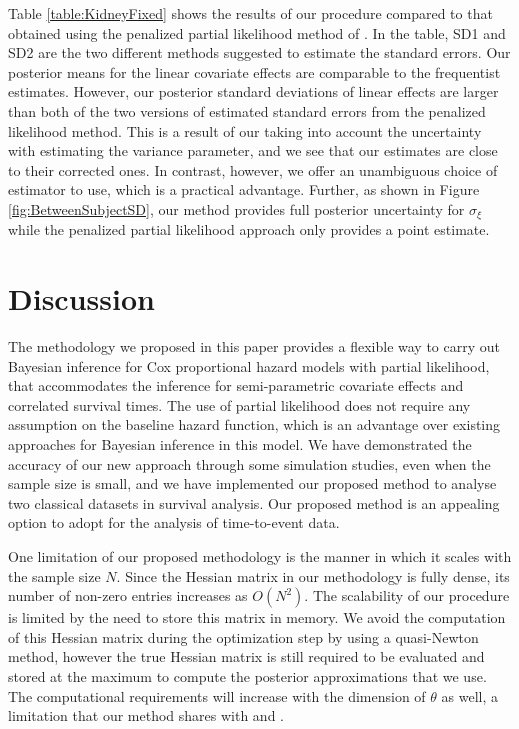 \documentclass[ba]{imsart}
\begin{document}
Table \ref{table:KidneyFixed} shows the results of our procedure compared to that obtained using the penalized partial likelihood method of \cite{freqPL}. In the table, SD1 and SD2 are the two different methods \cite{freqPL} suggested to estimate the standard errors. Our posterior means for the linear covariate effects are comparable to the frequentist estimates. However, our posterior standard deviations of linear effects are larger than both of the two versions of estimated standard errors from the penalized likelihood method. This is a result of our taking into account the uncertainty with estimating the variance parameter, and we see that our estimates are close to their corrected ones. In contrast, however, we offer an unambiguous choice of estimator to use, which is a practical advantage. Further, as shown in Figure \ref{fig:BetweenSubjectSD}, our method provides full posterior uncertainty for $\sigma_{\xi}$ while the penalized partial likelihood approach only provides a point estimate.

\section{Discussion}\label{sec:discussion}

The methodology we proposed in this paper provides a flexible way to carry out Bayesian inference for Cox proportional hazard models with partial likelihood, that accommodates the inference for semi-parametric covariate effects and correlated survival times. The use of partial likelihood does not require any assumption on the baseline hazard function, which is an advantage over existing approaches for Bayesian inference in this model. We have demonstrated the accuracy of our new approach through some simulation studies, even when the sample size is small, and we have implemented our proposed method to analyse two classical datasets in survival analysis. Our proposed method is an appealing option to adopt for the analysis of time-to-event data.

One limitation of our proposed methodology is the manner in which it scales with the sample size $N$. Since the Hessian matrix in our methodology is fully dense, its number of non-zero entries increases as $O(N^{2})$. The scalability of our procedure is limited by the need to store this matrix in memory. We avoid the computation of this Hessian matrix during the optimization step by using a quasi-Newton method, however the true Hessian matrix is still required to be evaluated and stored at the maximum to compute the posterior approximations that we use. The computational requirements will increase with the dimension of $\theta$ as well, a limitation that our method shares with \citet{inla} and \cite{casecross}.
\end{document}

